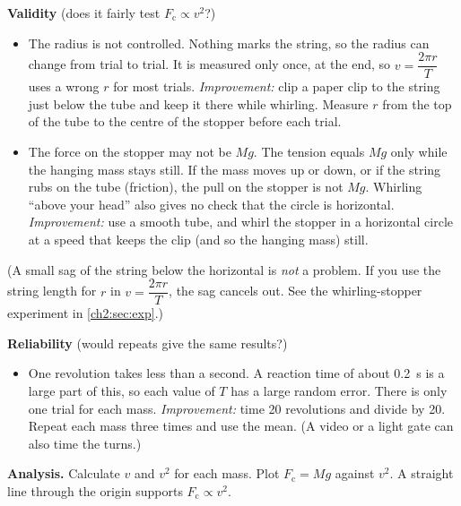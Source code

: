 \begin{practiceanswers}
\begin{practiceans}
\begin{modelanswer}
  \textbf{Validity} (does it fairly test $F_\mathrm{c} \propto v^2$?)
  \begin{itemize}[beginpenalty=10000]
    \item The radius is not controlled. Nothing marks the string, so the radius can change
          from trial to trial. It is measured only once, at the end, so $v = \dfrac{2\pi r}{T}$
          uses a wrong $r$ for most trials. \emph{Improvement:} clip a paper clip to the string
          just below the tube and keep it there while whirling. Measure $r$ from the top of
          the tube to the centre of the stopper before each trial.
    \item The force on the stopper may not be $Mg$. The tension equals $Mg$ only while the
          hanging mass stays still. If the mass moves up or down, or if the string rubs on
          the tube (friction), the pull on the stopper is not $Mg$. Whirling ``above your
          head'' also gives no check that the circle is horizontal. \emph{Improvement:} use a
          smooth tube, and whirl the stopper in a horizontal circle at a speed that keeps the
          clip (and so the hanging mass) still.
  \end{itemize}
  (A small sag of the string below the horizontal is \emph{not} a problem. If you use the
  string length for $r$ in $v = \dfrac{2\pi r}{T}$, the sag cancels out. See the
  whirling-stopper experiment in \cref{ch2:sec:exp}.)

  \textbf{Reliability} (would repeats give the same results?)
  \begin{itemize}[beginpenalty=10000]
    \item One revolution takes less than a second. A reaction time of about \qty{0.2}{s} is
          a large part of this, so each value of $T$ has a large random error. There is only
          one trial for each mass. \emph{Improvement:} time 20 revolutions and divide by 20.
          Repeat each mass three times and use the mean. (A video or a light gate can also
          time the turns.)
  \end{itemize}

  \textbf{Analysis.} Calculate $v$ and $v^2$ for each mass. Plot $F_\mathrm{c} = Mg$ against
  $v^2$. A straight line through the origin supports $F_\mathrm{c} \propto v^2$.
  \end{modelanswer}
  \begin{markingcriteria}
  \end{markingcriteria}
\end{practiceans}


\end{practiceanswers}
